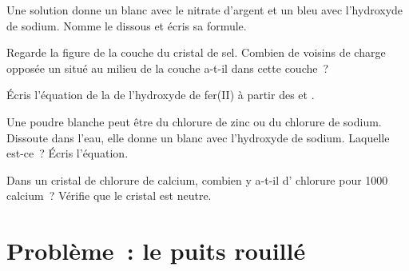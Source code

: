 \begin{exercise}[$\star\star$]\label{exo:g9:ions:8}
Une solution donne un  blanc avec le nitrate d'argent et un
 bleu avec l'hydroxyde de sodium. Nomme le 
dissous et écris sa formule.
\end{exercise}

\begin{exercise}[$\star\star$]\label{exo:g9:ions:9}
Regarde la figure de la couche du cristal de sel. Combien de voisins de
charge opposée un  situé au milieu de la couche a-t-il dans cette
couche~?
\end{exercise}

\begin{exercise}[$\star\star$]\label{exo:g9:ions:10}
Écris l'équation de la  de l'hydroxyde de fer(II) à partir
des   et .
\end{exercise}

\begin{exercise}[$\star\star\star$]\label{exo:g9:ions:11}
Une poudre blanche peut être du chlorure de zinc ou du chlorure de
sodium. Dissoute dans l'eau, elle donne un  blanc avec
l'hydroxyde de sodium. Laquelle est-ce~? Écris l'équation.
\end{exercise}

\begin{exercise}[$\star\star\star$]\label{exo:g9:ions:12}
Dans un cristal de chlorure de calcium, combien y a-t-il d' chlorure
pour 1000  calcium~? Vérifie que le cristal est neutre.
\end{exercise}

\section{Problème~: le puits rouillé}


